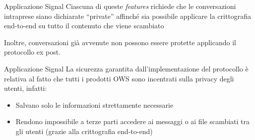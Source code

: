 \begin{frame}{Applicazione Signal}
    Ciascuna di queste \textit{features} richiede che le conversazioni intraprese siano dichiarate “private” affinché sia possibile applicare la crittografia end-to-end su tutto il contenuto che viene scambiato\newline\pause 

    Inoltre, conversazioni già avvenute non possono essere protette applicando il protocollo ex post.

    \cite{whatsappE2EE}

\end{frame}

\begin{frame}{Applicazione Signal}
    La sicurezza garantita dall'implementazione del protocollo è relativa al fatto che tutti i prodotti OWS sono incentrati sulla privacy degli utenti, infatti:
    \begin{itemize}
        \item Salvano solo le informazioni strettamente necessarie\pause
        \item Rendono impossibile a terze parti accedere ai messaggi o ai file scambiati tra gli utenti (grazie alla crittografia end-to-end)
    \end{itemize}
    \cite{Lumb}
\end{frame}